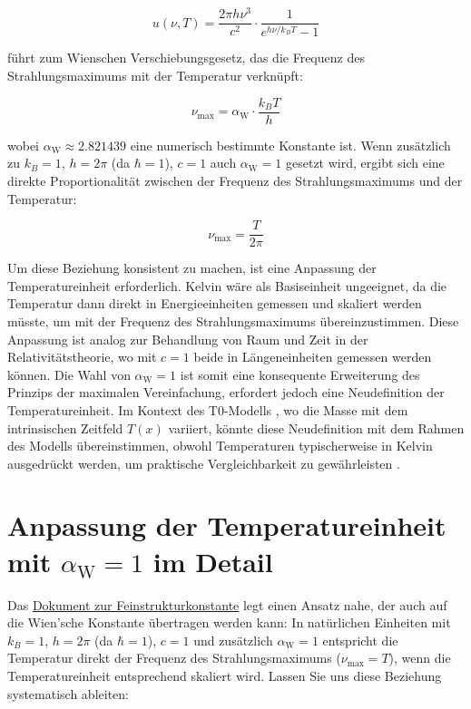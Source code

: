 \documentclass[12pt,a4paper]{article}
\newcommand{\Tfield}{T(x)}
\newcommand{\alphaW}{\alpha_{\text{W}}}
\begin{document}
	\begin{equation}
		u(\nu, T) = \frac{2\pi h \nu^3}{c^2} \cdot \frac{1}{e^{h \nu / k_B T} - 1}
	\end{equation}
	
	führt zum Wienschen Verschiebungsgesetz, das die Frequenz des Strahlungsmaximums mit der Temperatur verknüpft:
	
	\begin{equation}
		\nu_{\text{max}} = \alphaW \cdot \frac{k_B T}{h}
	\end{equation}
	
	wobei \(\alphaW \approx 2.821439\) eine numerisch bestimmte Konstante ist. Wenn zusätzlich zu \(k_B = 1\), \(h = 2\pi\) (da \(\hbar = 1\)), \(c = 1\) auch \(\alphaW = 1\) gesetzt wird, ergibt sich eine direkte Proportionalität zwischen der Frequenz des Strahlungsmaximums und der Temperatur:
	
	\begin{equation}
		\nu_{\text{max}} = \frac{T}{2\pi}
	\end{equation}
	
	Um diese Beziehung konsistent zu machen, ist eine Anpassung der Temperatureinheit erforderlich. Kelvin wäre als Basiseinheit ungeeignet, da die Temperatur dann direkt in Energieeinheiten gemessen und skaliert werden müsste, um mit der Frequenz des Strahlungsmaximums übereinzustimmen. Diese Anpassung ist analog zur Behandlung von Raum und Zeit in der Relativitätstheorie, wo mit \(c = 1\) beide in Längeneinheiten gemessen werden können. Die Wahl von \(\alphaW = 1\) ist somit eine konsequente Erweiterung des Prinzips der maximalen Vereinfachung, erfordert jedoch eine Neudefinition der Temperatureinheit. Im Kontext des T0-Modells \cite{pascher_galaxies_2025}, wo die Masse mit dem intrinsischen Zeitfeld \(\Tfield\) variiert, könnte diese Neudefinition mit dem Rahmen des Modells übereinstimmen, obwohl Temperaturen typischerweise in Kelvin ausgedrückt werden, um praktische Vergleichbarkeit zu gewährleisten \cite{pascher_messdifferenzen_2025}.
	
	\section{Anpassung der Temperatureinheit mit \(\alphaW = 1\) im Detail}
	
	Das \href{https://github.com/jpascher/T0-Time-Mass-Duality/tree/main/2/pdf/Deutsch/Natürliche Einheiten mit Feinstrukturkonstante alpha = 1_de.pdf}{Dokument zur Feinstrukturkonstante} \cite{pascher_alpha_2025} legt einen Ansatz nahe, der auch auf die Wien'sche Konstante übertragen werden kann: In natürlichen Einheiten mit \(k_B = 1\), \(h = 2\pi\) (da \(\hbar = 1\)), \(c = 1\) und zusätzlich \(\alphaW = 1\) entspricht die Temperatur direkt der Frequenz des Strahlungsmaximums (\(\nu_{\text{max}} = T\)), wenn die Temperatureinheit entsprechend skaliert wird. Lassen Sie uns diese Beziehung systematisch ableiten:
	
\end{document}
